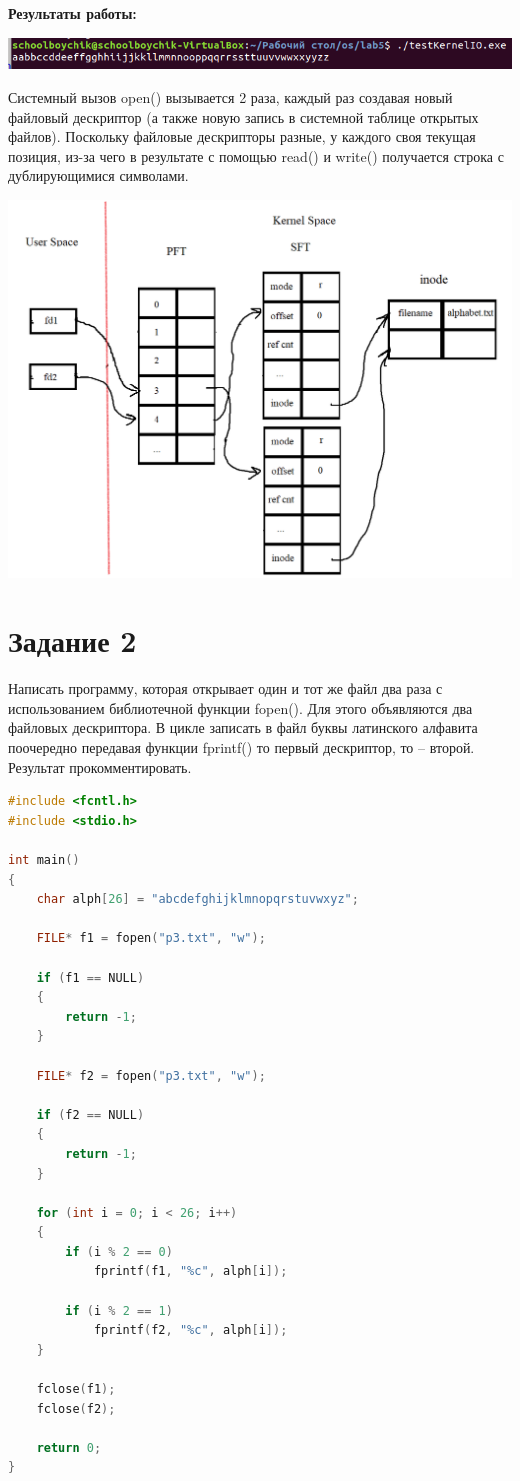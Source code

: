 \textbf{Результаты работы:}

\includegraphics[scale=1]{img/Screenshot_2.png}

Системный вызов open() вызывается 2 раза, каждый раз создавая новый файловый дескриптор (а также новую запись в системной таблице открытых файлов). Поскольку файловые дескрипторы разные, у каждого своя текущая позиция, из-за чего в результате с помощью read() и write() получается строка с дублирующимися символами. 

\includegraphics[scale=0.6]{img/2.png}
\newpage
\section*{Задание 2}

\Large Написать программу, которая открывает один и тот же файл два раза с использованием библиотечной функции fopen(). Для этого объявляются два файловых дескриптора. В цикле записать в файл буквы латинского алфавита поочередно передавая функции fprintf() то первый дескриптор, то – второй.
Результат прокомментировать.\newline


\begin{lstlisting}[language=c,label=some-code3,caption=Программа 3]
#include <fcntl.h>
#include <stdio.h>

int main()
{
	char alph[26] = "abcdefghijklmnopqrstuvwxyz";

	FILE* f1 = fopen("p3.txt", "w");

	if (f1 == NULL)
	{
		return -1;
	}

	FILE* f2 = fopen("p3.txt", "w");

	if (f2 == NULL)
	{
		return -1;
	}

	for (int i = 0; i < 26; i++)
	{
		if (i % 2 == 0)
			fprintf(f1, "%c", alph[i]);

		if (i % 2 == 1)
			fprintf(f2, "%c", alph[i]);
	}

	fclose(f1);
	fclose(f2);

	return 0;
}

\end{lstlisting} 

